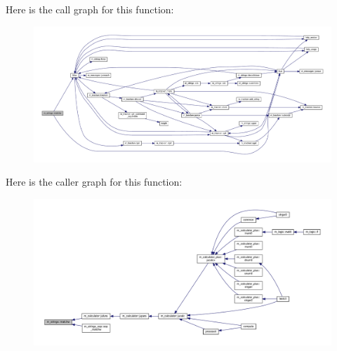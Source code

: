 Here is the call graph for this function\+:
\nopagebreak
\begin{figure}[H]
\begin{center}
\leavevmode
\includegraphics[width=350pt]{namespacem__strings_a1f9a363d0432f7373ef6a388f5893b0e_cgraph}
\end{center}
\end{figure}
Here is the caller graph for this function\+:
\nopagebreak
\begin{figure}[H]
\begin{center}
\leavevmode
\includegraphics[width=350pt]{namespacem__strings_a1f9a363d0432f7373ef6a388f5893b0e_icgraph}
\end{center}
\end{figure}
\mbox{\label{namespacem__strings_aba5a8d7fc092b38d1939f37a13247c1e}} 
